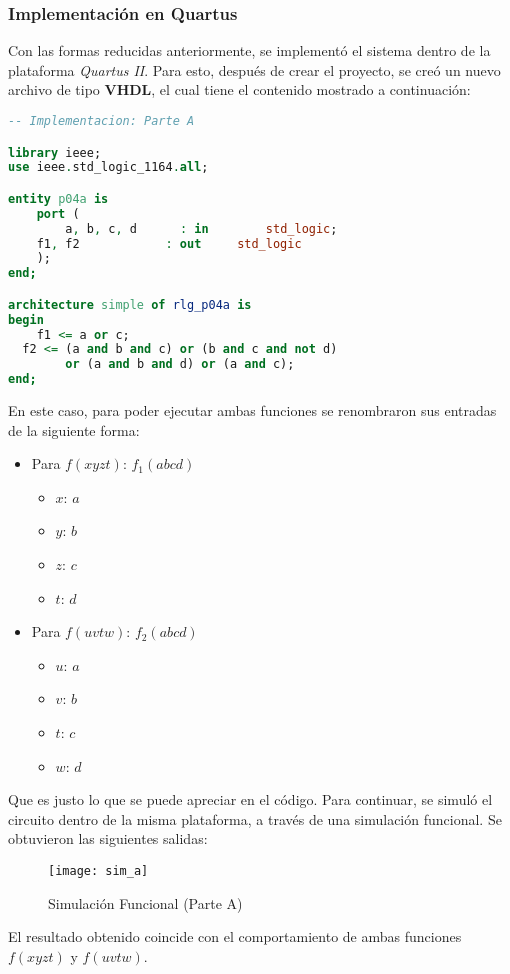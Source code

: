 \documentclass[../procedimientos.tex]{subfiles}
\begin{document}
\subsubsection{Implementación en Quartus}\label{subs:a_imp}
Con las formas reducidas anteriormente, se implementó el sistema dentro de la 
plataforma \textit{Quartus II}. Para esto, después de crear el proyecto, se 
creó un nuevo archivo de tipo \textbf{VHDL}, el cual tiene el contenido 
mostrado a continuación:
\begin{lstlisting}[language=VHDL, caption=Archivo VHDL (Parte A)]
-- Implementacion: Parte A

library ieee;
use ieee.std_logic_1164.all;

entity p04a is
	port (
		a, b, c, d		: in		std_logic;
    f1, f2			  : out		std_logic
	);
end;

architecture simple of rlg_p04a is
begin
	f1 <= a or c;
  f2 <= (a and b and c) or (b and c and not d)
        or (a and b and d) or (a and c);
end;
\end{lstlisting}

En este caso, para poder ejecutar ambas funciones se renombraron sus entradas 
de la siguiente forma:
\begin{itemize}
  \item Para $f(xyzt)$: $f_1(abcd)$
    \begin{itemize}
        \item $x$: $a$
        \item $y$: $b$
        \item $z$: $c$
        \item $t$: $d$
    \end{itemize}
  \item Para $f(uvtw)$: $f_2(abcd)$
    \begin{itemize}
        \item $u$: $a$
        \item $v$: $b$
        \item $t$: $c$
        \item $w$: $d$
    \end{itemize}
\end{itemize}

Que es justo lo que se puede apreciar en el código. Para continuar, se simuló 
el circuito dentro de la misma plataforma, a través de una simulación 
funcional. Se obtuvieron las siguientes salidas:
\begin{figure}[H]
  \centering
  \texttt{[image: sim\_a]}
  \caption{Simulación Funcional (Parte A)}
\end{figure}

El resultado obtenido coincide con el comportamiento de ambas funciones 
$f(xyzt)$ y $f(uvtw)$.
\end{document}
